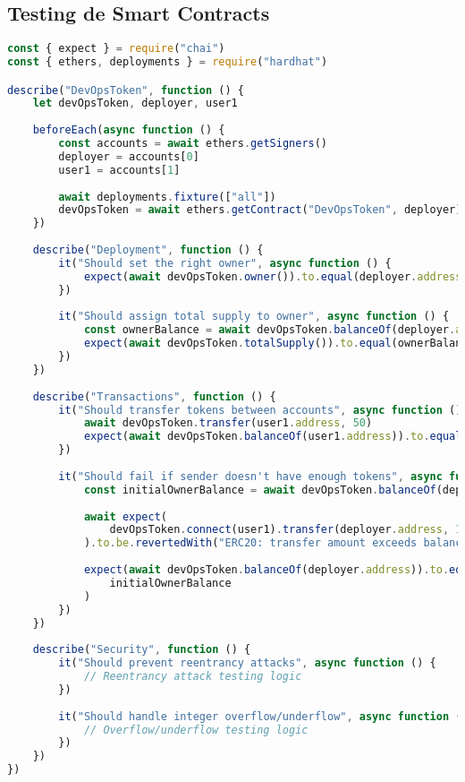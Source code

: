 \documentclass[12pt,a4paper]{article}
\begin{document}
\subsection{Testing de Smart Contracts}
\begin{lstlisting}[language=javascript, caption=Tests automatizados para smart contracts]
const { expect } = require("chai")
const { ethers, deployments } = require("hardhat")

describe("DevOpsToken", function () {
    let devOpsToken, deployer, user1
    
    beforeEach(async function () {
        const accounts = await ethers.getSigners()
        deployer = accounts[0]
        user1 = accounts[1]
        
        await deployments.fixture(["all"])
        devOpsToken = await ethers.getContract("DevOpsToken", deployer)
    })
    
    describe("Deployment", function () {
        it("Should set the right owner", async function () {
            expect(await devOpsToken.owner()).to.equal(deployer.address)
        })
        
        it("Should assign total supply to owner", async function () {
            const ownerBalance = await devOpsToken.balanceOf(deployer.address)
            expect(await devOpsToken.totalSupply()).to.equal(ownerBalance)
        })
    })
    
    describe("Transactions", function () {
        it("Should transfer tokens between accounts", async function () {
            await devOpsToken.transfer(user1.address, 50)
            expect(await devOpsToken.balanceOf(user1.address)).to.equal(50)
        })
        
        it("Should fail if sender doesn't have enough tokens", async function () {
            const initialOwnerBalance = await devOpsToken.balanceOf(deployer.address)
            
            await expect(
                devOpsToken.connect(user1).transfer(deployer.address, 1)
            ).to.be.revertedWith("ERC20: transfer amount exceeds balance")
            
            expect(await devOpsToken.balanceOf(deployer.address)).to.equal(
                initialOwnerBalance
            )
        })
    })
    
    describe("Security", function () {
        it("Should prevent reentrancy attacks", async function () {
            // Reentrancy attack testing logic
        })
        
        it("Should handle integer overflow/underflow", async function () {
            // Overflow/underflow testing logic
        })
    })
})
\end{lstlisting}
\end{document}
